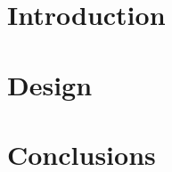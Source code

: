 \documentclass[10pt]{report}
\begin{document}

\restoregeometry

\setcounter{tocdepth}{5}

\let\LaTeXStandardClearpage\clearpage
\let\clearpage\relax %

\tableofcontents
\listoffigures
\listoftables

\let\clearpage\LaTeXStandardClearpage %

\pagebreak

\chapter{Introduction}

\pagebreak

\chapter{Design}

\pagebreak

\chapter{Conclusions}

\pagebreak

\printbibliography
\end{document}
